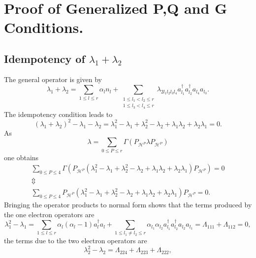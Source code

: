 \documentclass[aps,preprint]{revtex4}%
\begin{document}
\section{Proof of Generalized P,Q and G Conditions. \label{Proof}}

\subsection{Idempotency of $\lambda_{1}+\lambda_{2}$}

The general operator is given by%
\begin{equation}
\lambda_{1}+\lambda_{2}=\sum_{1\leq l\leq r}\alpha_{l}n_{l}+\sum
_{\substack{1\leq l_{1}<l_{2}\leq r\\1\leq l_{3}<l_{4}\leq r}}\lambda
_{2l_{1}l_{2}l_{3}l_{4}}a_{l_{1}}^{\dagger}a_{l_{2}}^{\dagger}a_{l_{4}%
}a_{l_{3}}.
\end{equation}
The idempotency condition leads to%
\begin{equation}
\left(  \lambda_{1}+\lambda_{2}\right)  ^{2}-\lambda_{1}-\lambda_{2}%
=\lambda_{1}^{2}-\lambda_{1}+\lambda_{2}^{2}-\lambda_{2}+\lambda_{1}%
\lambda_{2}+\lambda_{2}\lambda_{1}=0.
\end{equation}
As
\begin{equation}
\lambda=\sum_{0\leq P\leq r}\Gamma\left(  P_{\mathcal{H}^{P}}\lambda
P_{\mathcal{H}^{P}}\right)
\end{equation}
one obtains
\begin{gather}
\sum_{0\leq P\leq4}\Gamma\left(  P_{\mathcal{H}^{P}}\left(  \lambda_{1}%
^{2}-\lambda_{1}+\lambda_{2}^{2}-\lambda_{2}+\lambda_{1}\lambda_{2}%
+\lambda_{2}\lambda_{1}\right)  P_{\mathcal{H}^{P}}\right)  =0\\
\Updownarrow\\
\sum_{0\leq P\leq4}P_{\mathcal{H}^{P}}\left(  \lambda_{1}^{2}-\lambda
_{1}+\lambda_{2}^{2}-\lambda_{2}+\lambda_{1}\lambda_{2}+\lambda_{2}\lambda
_{1}\right)  P_{\mathcal{H}^{P}}=0.
\end{gather}
Bringing the operator products to normal form shows that the terms produced by
the one electron operators are
\[
\lambda_{1}^{2}-\lambda_{1}=\sum_{1\leq l\leq r}\alpha_{l}\left(  \alpha
_{l}-1\right)  a_{l}^{\dagger}a_{l}+\sum_{1\leq l_{1}\neq l_{2}\leq r}%
\alpha_{l_{1}}\alpha_{l_{2}}a_{l_{1}}^{\dagger}a_{l_{2}}^{\dagger}a_{l_{2}%
}a_{l_{1}}=\Lambda_{111}+\Lambda_{112}=0,
\]
the terms due to the two electron operators are
\begin{equation}
\lambda_{2}^{2}-\lambda_{2}=\Lambda_{224}+\Lambda_{223}+\Lambda_{222},
\end{equation}
\end{document}
